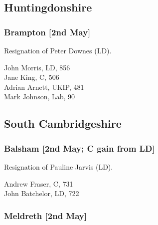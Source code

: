 \documentclass[a4paper,openany,10pt]{book}
\begin{document}
\subsection*{Huntingdonshire}

\subsubsection*{Brampton \hspace*{\fill}\nolinebreak[1]%
\enspace\hspace*{\fill}
[2nd May]}


Resignation of Peter Downes (LD).



John Morris, LD, 856\\
Jane King, C, 506\\
Adrian Arnett, UKIP, 481\\
Mark Johnson, Lab, 90\\


\subsection*{South Cambridgeshire}

\subsubsection*{Balsham \hspace*{\fill}\nolinebreak[1]%
\enspace\hspace*{\fill}
[2nd May; C gain from LD]}


Resignation of Pauline Jarvis (LD).



Andrew Fraser, C, 731\\
John Batchelor, LD, 722\\


\subsubsection*{Meldreth \hspace*{\fill}\nolinebreak[1]%
\enspace\hspace*{\fill}
[2nd May]}

\end{document}
